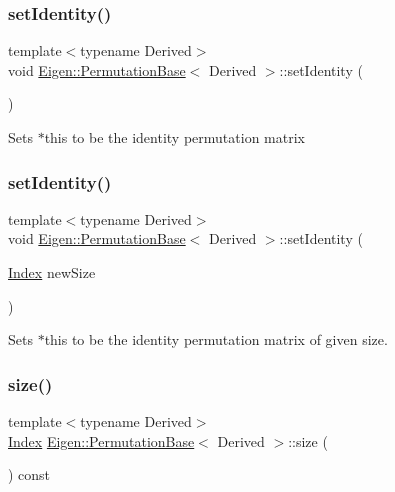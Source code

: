 \subsubsection{\texorpdfstring{setIdentity()}{setIdentity()}\hspace{0.1cm}{\footnotesize\ttfamily [1/2]}}
{\footnotesize\ttfamily template$<$typename Derived$>$ \\
void \mbox{\hyperlink{class_eigen_1_1_permutation_base}{Eigen\+::\+Permutation\+Base}}$<$ Derived $>$\+::set\+Identity (\begin{DoxyParamCaption}{ }\end{DoxyParamCaption})\hspace{0.3cm}{\ttfamily [inline]}}

Sets $\ast$this to be the identity permutation matrix \mbox{\label{class_eigen_1_1_permutation_base_a830a80511a61634ef437795916f7f8da}} 
\subsubsection{\texorpdfstring{setIdentity()}{setIdentity()}\hspace{0.1cm}{\footnotesize\ttfamily [2/2]}}
{\footnotesize\ttfamily template$<$typename Derived$>$ \\
void \mbox{\hyperlink{class_eigen_1_1_permutation_base}{Eigen\+::\+Permutation\+Base}}$<$ Derived $>$\+::set\+Identity (\begin{DoxyParamCaption}\item[{\mbox{\hyperlink{struct_eigen_1_1_eigen_base_a554f30542cc2316add4b1ea0a492ff02}{Index}}}]{new\+Size }\end{DoxyParamCaption})\hspace{0.3cm}{\ttfamily [inline]}}

Sets $\ast$this to be the identity permutation matrix of given size. \mbox{\label{class_eigen_1_1_permutation_base_a2216f9ce7b453ac39c46ff0323daeac9}} 
\subsubsection{\texorpdfstring{size()}{size()}}
{\footnotesize\ttfamily template$<$typename Derived$>$ \\
\mbox{\hyperlink{struct_eigen_1_1_eigen_base_a554f30542cc2316add4b1ea0a492ff02}{Index}} \mbox{\hyperlink{class_eigen_1_1_permutation_base}{Eigen\+::\+Permutation\+Base}}$<$ Derived $>$\+::size (\begin{DoxyParamCaption}{ }\end{DoxyParamCaption}) const\hspace{0.3cm}{\ttfamily [inline]}}

